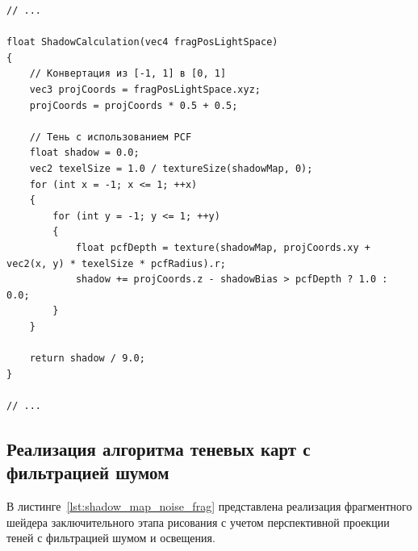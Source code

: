 \begin{center}
\captionsetup{justification=centering, singlelinecheck=off}
\begin{lstlisting}[label=lst:shadow_map_pcf_ortho_frag, caption=Фрагментный шейдер с учетом ортогонального проецирония теней]
// ...

float ShadowCalculation(vec4 fragPosLightSpace)
{
    // Конвертация из [-1, 1] в [0, 1]
    vec3 projCoords = fragPosLightSpace.xyz;
    projCoords = projCoords * 0.5 + 0.5;
    
    // Тень с использованием PCF
    float shadow = 0.0;
    vec2 texelSize = 1.0 / textureSize(shadowMap, 0);
    for (int x = -1; x <= 1; ++x)
    {
        for (int y = -1; y <= 1; ++y)
        {
            float pcfDepth = texture(shadowMap, projCoords.xy + vec2(x, y) * texelSize * pcfRadius).r;
            shadow += projCoords.z - shadowBias > pcfDepth ? 1.0 : 0.0;
        }
    }

    return shadow / 9.0;
}

// ...
\end{lstlisting}
\end{center}

\subsection{Реализация алгоритма теневых карт с фильтрацией шумом}

В листинге~\ref{lst:shadow_map_noise_frag} представлена реализация фрагментного шейдера заключительного
этапа рисования с учетом перспективной проекции теней с фильтрацией шумом и освещения.

